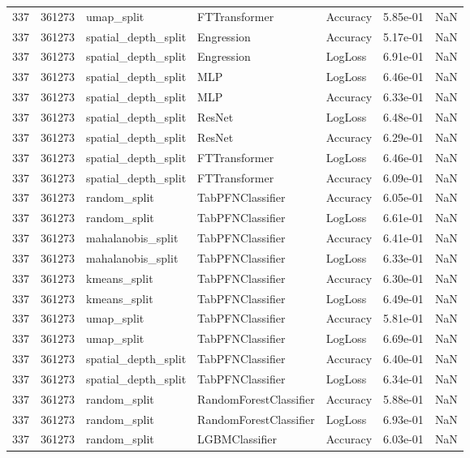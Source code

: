 \begin{tabular}{rrlllrr}
337 & 361273 & umap\_split & FTTransformer & Accuracy & 5.85e-01 & NaN \\
337 & 361273 & spatial\_depth\_split & Engression & Accuracy & 5.17e-01 & NaN \\
337 & 361273 & spatial\_depth\_split & Engression & LogLoss & 6.91e-01 & NaN \\
337 & 361273 & spatial\_depth\_split & MLP & LogLoss & 6.46e-01 & NaN \\
337 & 361273 & spatial\_depth\_split & MLP & Accuracy & 6.33e-01 & NaN \\
337 & 361273 & spatial\_depth\_split & ResNet & LogLoss & 6.48e-01 & NaN \\
337 & 361273 & spatial\_depth\_split & ResNet & Accuracy & 6.29e-01 & NaN \\
337 & 361273 & spatial\_depth\_split & FTTransformer & LogLoss & 6.46e-01 & NaN \\
337 & 361273 & spatial\_depth\_split & FTTransformer & Accuracy & 6.09e-01 & NaN \\
337 & 361273 & random\_split & TabPFNClassifier & Accuracy & 6.05e-01 & NaN \\
337 & 361273 & random\_split & TabPFNClassifier & LogLoss & 6.61e-01 & NaN \\
337 & 361273 & mahalanobis\_split & TabPFNClassifier & Accuracy & 6.41e-01 & NaN \\
337 & 361273 & mahalanobis\_split & TabPFNClassifier & LogLoss & 6.33e-01 & NaN \\
337 & 361273 & kmeans\_split & TabPFNClassifier & Accuracy & 6.30e-01 & NaN \\
337 & 361273 & kmeans\_split & TabPFNClassifier & LogLoss & 6.49e-01 & NaN \\
337 & 361273 & umap\_split & TabPFNClassifier & Accuracy & 5.81e-01 & NaN \\
337 & 361273 & umap\_split & TabPFNClassifier & LogLoss & 6.69e-01 & NaN \\
337 & 361273 & spatial\_depth\_split & TabPFNClassifier & Accuracy & 6.40e-01 & NaN \\
337 & 361273 & spatial\_depth\_split & TabPFNClassifier & LogLoss & 6.34e-01 & NaN \\
337 & 361273 & random\_split & RandomForestClassifier & Accuracy & 5.88e-01 & NaN \\
337 & 361273 & random\_split & RandomForestClassifier & LogLoss & 6.93e-01 & NaN \\
337 & 361273 & random\_split & LGBMClassifier & Accuracy & 6.03e-01 & NaN \\

\end{tabular}
